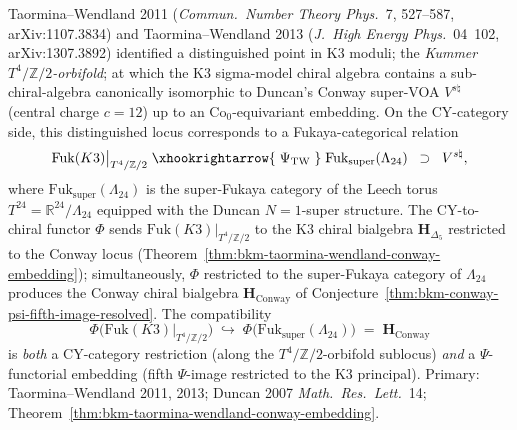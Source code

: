 \begin{remark}
\label{rem:cycat-taormina-wendland-locus}
Taormina--Wendland 2011 (\emph{Commun.~Number Theory Phys.}~7, 527--587,
arXiv:1107.3834) and Taormina--Wendland 2013 (\emph{J.\ High Energy
Phys.}~04~102, arXiv:1307.3892) identified a distinguished point in
K3 moduli; the \emph{Kummer $T^4/\mathbb{Z}/2$-orbifold}; at
which the K3 sigma-model chiral algebra contains a sub-chiral-algebra
canonically isomorphic to Duncan's Conway super-VOA $V^{s\natural}$
(central charge $c = 12$) up to an $\mathrm{Co}_0$-equivariant
embedding. On the CY-category side, this distinguished locus
corresponds to a Fukaya-categorical relation
\[
 \mathrm{Fuk}(K3)\bigr|_{T^4/\mathbb{Z}/2}
 \;\xhookrightarrow{\;\Psi_{\mathrm{TW}}\;}\;
 \mathrm{Fuk}_{\mathrm{super}}(\Lambda_{24})
 \;\;\supset\;\;
 V^{s\natural},
\]
where $\mathrm{Fuk}_{\mathrm{super}}(\Lambda_{24})$ is the
super-Fukaya category of the Leech torus
$T^{24} = \mathbb{R}^{24}/\Lambda_{24}$ equipped with the Duncan
$N{=}1$-super structure.
The CY-to-chiral functor $\Phi$ sends
$\mathrm{Fuk}(K3)|_{T^4/\mathbb{Z}/2}$
to the K3 chiral bialgebra $\mathbf{H}_{\Delta_5}$ restricted to
the Conway locus (Theorem~\textup{\ref{thm:bkm-taormina-wendland-conway-embedding}});
simultaneously, $\Phi$ restricted to the super-Fukaya category
of $\Lambda_{24}$ produces the Conway chiral bialgebra
$\mathbf{H}_{\mathrm{Conway}}$ of
Conjecture~\textup{\ref{thm:bkm-conway-psi-fifth-image-resolved}}. The
compatibility
\[
 \Phi\bigl(\mathrm{Fuk}(K3)|_{T^4/\mathbb{Z}/2}\bigr)
 \;\hookrightarrow\;
 \Phi\bigl(\mathrm{Fuk}_{\mathrm{super}}(\Lambda_{24})\bigr)
 \;=\;
 \mathbf{H}_{\mathrm{Conway}}
\]
is \emph{both} a CY-category restriction (along the
$T^4/\mathbb{Z}/2$-orbifold sublocus) \emph{and} a $\Psi$-functorial
embedding (fifth $\Psi$-image restricted to the K3 principal).
Primary: Taormina--Wendland 2011, 2013;
Duncan 2007 \emph{Math.~Res.\ Lett.}~14;
Theorem~\textup{\ref{thm:bkm-taormina-wendland-conway-embedding}}.
\end{remark}

